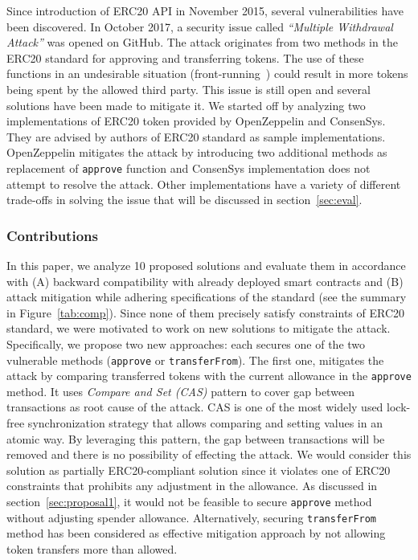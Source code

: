 Since introduction of ERC20 API in November 2015, several vulnerabilities have been discovered. In October 2017, a security issue called \textit{``Multiple Withdrawal Attack''} was opened on GitHub\cite{Ref13,Ref07}. The attack originates from two methods in the ERC20 standard for approving and transferring tokens. The use of these functions in an undesirable situation (\eg front-running~\cite{eskandari2019sok}) could result in more tokens being spent by the allowed third party. This issue is still open and several solutions have been made to mitigate it. We started off by analyzing two implementations of ERC20 token provided by OpenZeppelin\cite{Ref10} and ConsenSys\cite{Ref11}. They are advised by authors of ERC20 standard \cite{Ref08} as sample implementations. OpenZeppelin mitigates the attack by introducing two additional methods as replacement of \texttt{approve} function and ConsenSys implementation does not attempt to resolve the attack. Other implementations have a variety of different trade-offs in solving the issue that will be discussed in section~\ref{sec:eval}.

\subsubsection*{Contributions} In this paper, we analyze 10 proposed solutions and evaluate them in accordance with (A) backward compatibility with already deployed smart contracts and (B) attack mitigation while adhering specifications of the standard (see the summary in Figure~\ref{tab:comp}). Since none of them precisely satisfy constraints of ERC20 standard, we were motivated to work on new solutions to mitigate the attack. Specifically, we propose two new approaches: each secures one of the two vulnerable methods (\ie \texttt{approve} or \texttt{transferFrom}). The first one, mitigates the attack by comparing transferred tokens with the current allowance in the \texttt{approve} method. It uses \textit{Compare and Set (CAS)} pattern\cite{Ref06} to cover gap between transactions as root cause of the attack. CAS is one of the most widely used lock-free synchronization strategy that allows comparing and setting values in an atomic way. By leveraging this pattern, the gap between transactions will be removed and there is no possibility of effecting the attack. We would consider this solution as partially ERC20-compliant solution since it violates one of ERC20 constraints that prohibits any adjustment in the allowance. As discussed in section~\ref{sec:proposal1}, it would not be feasible to secure \texttt{approve} method without adjusting spender allowance. Alternatively, securing \texttt{transferFrom} method has been considered as effective mitigation approach by not allowing token transfers more than allowed.

